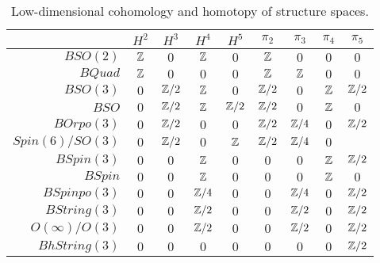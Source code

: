 \documentclass{amsart}
\begin{document}
\begin{table}[!ht]
\begin{tabular}{|r||c|c|c|c||c|c|c|c|}
\hline
& $H^2$ & $H^3$ & $H^4$ & $H^5$ & $\pi_2$ & $\pi_3$ & $\pi_4$ & $\pi_5$ \\
\hline
$BSO(2)$ %
& $\mathbb Z$ & $0$ & $\mathbb Z$ & $0$ 
& $\mathbb Z$ & $0$ & $0$ & $0$ \\
$BQuad$ %
& $\mathbb Z$ & $0$ & $0$ & $0$
& $\mathbb Z$ & $\mathbb Z$ & $0$ & $0$ \\
$BSO(3)$ %
& $0$ & $\mathbb Z/2$ & $\mathbb Z$ & $0$
& $\mathbb Z/2$ & $0$ & $\mathbb Z$ & $\mathbb Z/2$ \\ %
$BSO$
& $0$ & $\mathbb Z/2$ & $\mathbb Z$ & $\mathbb Z/2$ %
& $\mathbb Z/2$ & $0$ & $\mathbb Z$ & $0$ \\ %
$BOrpo(3)$ %
& $0$ & $\mathbb Z/2$ & $0$ & $0$ 
& $\mathbb Z/2$ & $\mathbb Z/4$ & $0$ & $\mathbb Z/2$  \\
$Spin(6)/SO(3)$ %
& $0$ & $\mathbb Z/2$ & $0$ & $\mathbb Z$ %
& $\mathbb Z/2$ & $\mathbb Z/4$ & $0$ & \CDcomm{$??$} \\
$BSpin(3)$ %
& $0$ & $0$ & $\mathbb Z$ & $0$
& $0$ & $0$ & $\mathbb Z$ & $\mathbb Z/2$ \\
$BSpin$
& $0$ & $0$ & $\mathbb Z$ & $0$ %
& $0$ & $0$ & $\mathbb Z$ & $0$ \\ %
$BSpinpo(3)$
& $0$ & $0$ & $\mathbb Z/4$ & $0$
& $0$ & $\mathbb Z/4$ & $0$ & $\mathbb Z/2$ \\
$BString(3)$ %
& $0$ & $0$ & $\mathbb Z/2$ & $0$
& $0$ & $\mathbb Z/2$ & $0$ & $\mathbb Z/2$ \\
$O(\infty)/O(3)$ %
& $0$ & $0$ & $\mathbb Z/2$ & $0$
& $0$ & $\mathbb Z/2$ & $0$ & $\mathbb Z/2$ \\
$BhString(3)$ %
& $0$ & $0$ & $0$ & $0$
& $0$ & $0$ & $0$ & $\mathbb Z/2$ \\
\hline 
\end{tabular} \vspace*{8pt}
\caption{Low-dimensional cohomology and homotopy of structure spaces.} \label{table-structurecalc}
\end{table} 
\end{document}
